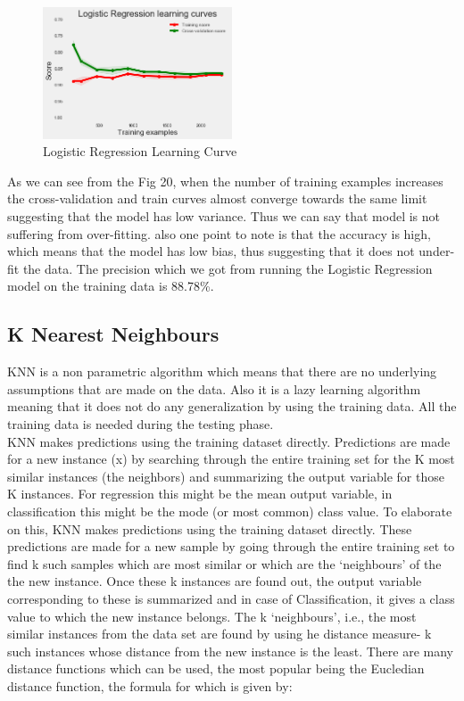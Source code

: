 \begin{figure}[h]
\caption{Logistic Regression Learning Curve}
\label{5.1}
\centering
\includegraphics[width=0.5\textwidth]{images/5_1.png}
\end{figure}

As we can see from the Fig 20, when the number of training examples increases the cross-validation and train curves almost converge towards the same limit suggesting that the model has low variance. Thus we can say that model is not suffering from over-fitting. also one point to note is that the accuracy is high, which means that the model has low bias, thus suggesting that it does not under-fit the data. The precision which we got from running the Logistic Regression model on the training data is 88.78\%.

\subsection{K Nearest Neighbours}
KNN is a non parametric algorithm which means that there are no underlying assumptions that are made on the data. Also it is a lazy learning algorithm meaning that it does not do any generalization by using the training data. All the training data is needed during the testing phase.\cite{link11}\\
KNN makes predictions using the training dataset directly. Predictions are made for a new instance (x) by searching through the entire training set for the K most similar instances (the neighbors) and summarizing the output variable for those K instances. For regression this might be the mean output variable, in classification this might be the mode (or most common) class value. To elaborate on this, KNN makes predictions using the training dataset directly. These predictions are made for a new sample by going through the entire training set to find k such samples which are most similar or which are the `neighbours' of the the new instance. Once these k instances are found out, the output variable corresponding to these is summarized and in case of Classification, it gives a class value to which the new instance belongs. The k `neighbours', i.e., the most similar instances from the data set are found by using he distance measure- k such instances whose distance from the new instance is the least. There are many distance functions which can be used, the most popular being the Eucledian distance function, the formula for which is given by:

